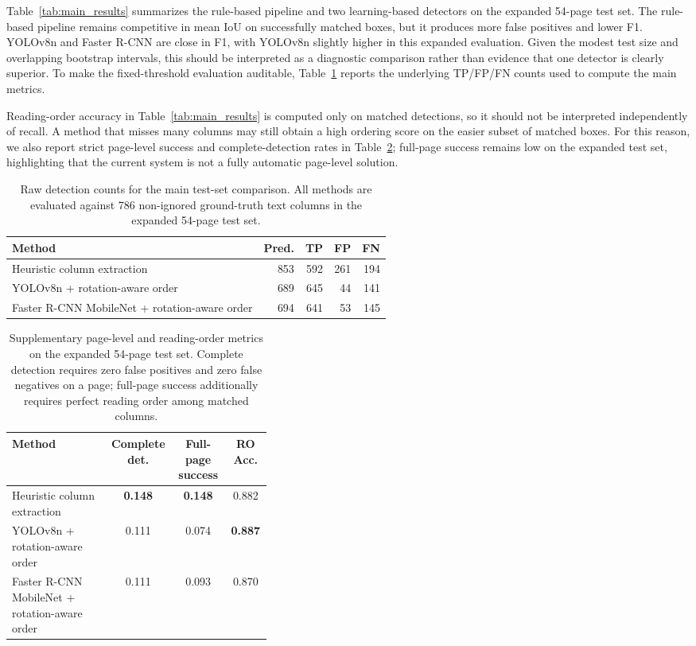 \documentclass[12pt]{article}
\begin{document}
Table~\ref{tab:main_results} summarizes the rule-based pipeline and two learning-based detectors on the expanded 54-page test set. The rule-based pipeline remains competitive in mean IoU on successfully matched boxes, but it produces more false positives and lower F1. YOLOv8n and Faster R-CNN are close in F1, with YOLOv8n slightly higher in this expanded evaluation. Given the modest test size and overlapping bootstrap intervals, this should be interpreted as a diagnostic comparison rather than evidence that one detector is clearly superior. To make the fixed-threshold evaluation auditable, Table~\ref{tab:main_counts} reports the underlying TP/FP/FN counts used to compute the main metrics.

Reading-order accuracy in Table~\ref{tab:main_results} is computed only on matched detections, so it should not be interpreted independently of recall. A method that misses many columns may still obtain a high ordering score on the easier subset of matched boxes. For this reason, we also report strict page-level success and complete-detection rates in Table~\ref{tab:enhanced_order}; full-page success remains low on the expanded test set, highlighting that the current system is not a fully automatic page-level solution.

\begin{table}[t]
\centering
\scriptsize\setlength{\tabcolsep}{3pt}
\caption{Raw detection counts for the main test-set comparison. All methods are evaluated against 786 non-ignored ground-truth text columns in the expanded 54-page test set.}
\label{tab:main_counts}
\begin{tabular}{lrrrr}
\toprule
Method & Pred. & TP & FP & FN \\
\midrule
Heuristic column extraction & 853 & 592 & 261 & 194 \\
YOLOv8n + rotation-aware order & 689 & 645 & 44 & 141 \\
Faster R-CNN MobileNet + rotation-aware order & 694 & 641 & 53 & 145 \\
\bottomrule
\end{tabular}
\end{table}

\begin{table}[t]
\centering
\scriptsize\setlength{\tabcolsep}{3pt}
\caption{Supplementary page-level and reading-order metrics on the expanded 54-page test set. Complete detection requires zero false positives and zero false negatives on a page; full-page success additionally requires perfect reading order among matched columns.}
\label{tab:enhanced_order}
\begin{tabular}{p{0.38\linewidth}ccc}
\toprule
Method & Complete det. & Full-page success & RO Acc. \\
\midrule
Heuristic column extraction & \textbf{0.148} & \textbf{0.148} & 0.882 \\
YOLOv8n + rotation-aware order & 0.111 & 0.074 & \textbf{0.887} \\
Faster R-CNN MobileNet + rotation-aware order & 0.111 & 0.093 & 0.870 \\
\bottomrule
\end{tabular}
\end{table}
\end{document}
